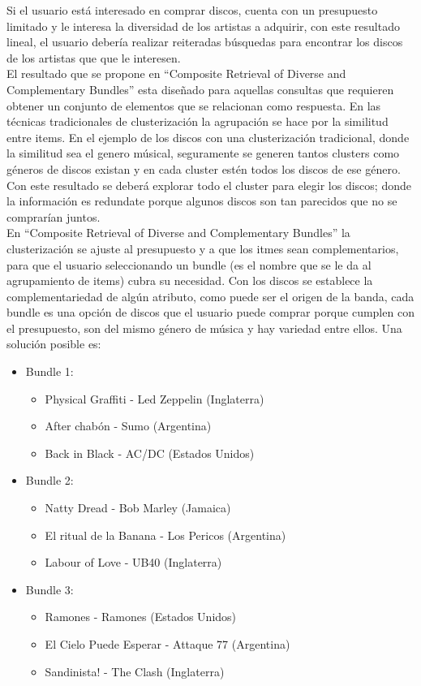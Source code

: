 Si el usuario está interesado en comprar discos, cuenta con un presupuesto limitado y le interesa la diversidad de los artistas a adquirir, con este resultado lineal, el usuario debería realizar reiteradas búsquedas para encontrar los discos de los artistas que que le interesen.\\

El resultado que se propone en ``Composite Retrieval of Diverse and Complementary Bundles'' esta diseñado para aquellas consultas 
que requieren obtener un conjunto de elementos que se relacionan como respuesta. En las técnicas tradicionales de 
clusterización la agrupación se hace por la similitud entre items. En el ejemplo de los discos con una clusterización tradicional,
donde la similitud sea el genero músical, seguramente se generen tantos clusters como géneros de discos existan y en cada cluster estén todos 
los discos de ese género. Con este resultado se deberá explorar todo el cluster para elegir los discos; donde la información es redundate 
porque algunos discos son tan parecidos que no se comprarían juntos.\\

En ``Composite Retrieval of Diverse and Complementary Bundles'' la clusterización se ajuste al presupuesto y a que los itmes sean complementarios, 
para que el usuario seleccionando un bundle (es el nombre que se le da al agrupamiento de items) cubra su necesidad. Con los discos 
se establece la complementariedad de algún atributo, como puede ser el origen de la banda, cada bundle es una opción de discos que el usuario 
puede comprar porque cumplen con el presupuesto, son del mismo género de música y hay variedad entre ellos. Una solución posible es:
\begin{itemize}
  \item Bundle 1:
  \begin{itemize}
    \item Physical Graffiti - Led Zeppelin (Inglaterra)
    \item After chabón - Sumo (Argentina)
    \item Back in Black - AC/DC (Estados Unidos)
  \end{itemize}
  \item Bundle 2:
  \begin{itemize}
    \item Natty Dread - Bob Marley (Jamaica)
    \item El ritual de la Banana - Los Pericos (Argentina)
    \item Labour of Love - UB40 (Inglaterra)
  \end{itemize}
	  \item Bundle 3:
  \begin{itemize}
    \item Ramones - Ramones (Estados Unidos)
    \item El Cielo Puede Esperar - Attaque 77 (Argentina)
    \item Sandinista! - The Clash (Inglaterra)
  \end{itemize}
\end{itemize}

